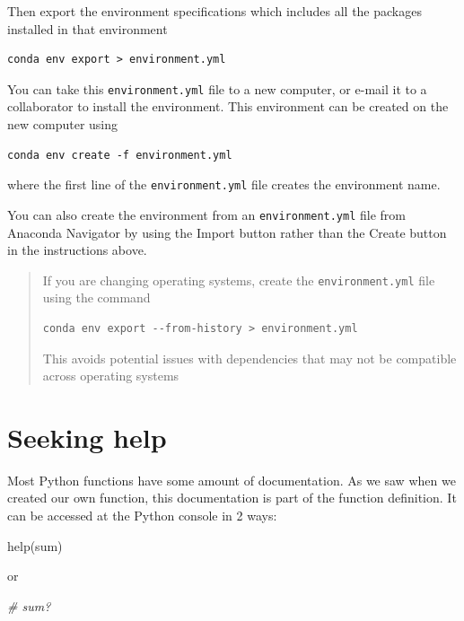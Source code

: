 \documentclass[
  letterpaper,
]{scrbook}
\newenvironment{Shaded}{\begin{snugshade}}{\end{snugshade}}
\newcommand{\BuiltInTok}[1]{#1}
\newcommand{\CommentTok}[1]{\textcolor[rgb]{0.56,0.35,0.01}{\textit{#1}}}
\newcommand{\NormalTok}[1]{#1}
\begin{document}
Then export the environment specifications which includes all the packages installed in that environment

\begin{verbatim}
conda env export > environment.yml
\end{verbatim}

You can take this \texttt{environment.yml} file to a new computer, or e-mail it to a collaborator to install the environment. This environment can be created on the new computer using

\begin{verbatim}
conda env create -f environment.yml
\end{verbatim}

where the first line of the \texttt{environment.yml} file creates the environment name.

You can also create the environment from an \texttt{environment.yml} file from Anaconda Navigator by using the Import button rather than the Create button in the instructions above.

\begin{quote}
If you are changing operating systems, create the \texttt{environment.yml} file using the command

\begin{verbatim}
conda env export --from-history > environment.yml
\end{verbatim}

This avoids potential issues with dependencies that may not be compatible across operating systems
\end{quote}

\hypertarget{seeking-help}{%
\section{Seeking help}\label{seeking-help}}

Most Python functions have some amount of documentation. As we saw when we created our own function, this documentation is part of the function definition. It can be accessed at the Python console in 2 ways:

\begin{Shaded}
\begin{Highlighting}[]
\BuiltInTok{help}\NormalTok{(}\BuiltInTok{sum}\NormalTok{)}
\end{Highlighting}
\end{Shaded}

or

\begin{Shaded}
\begin{Highlighting}[]
\CommentTok{\# sum?}
\end{Highlighting}
\end{Shaded}
\end{document}
